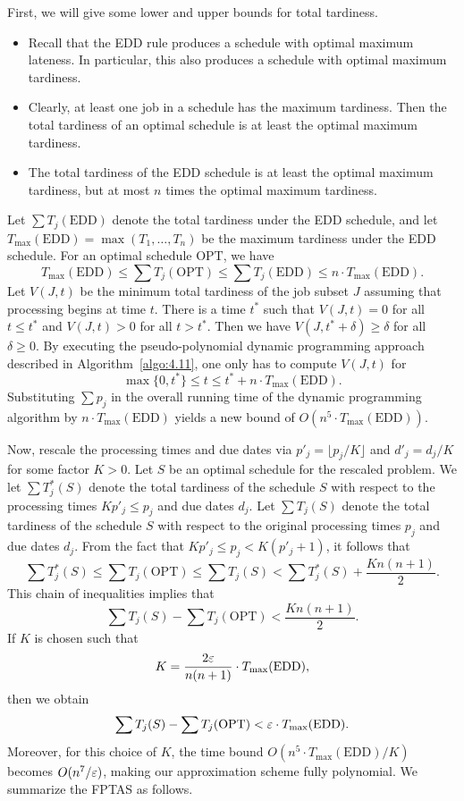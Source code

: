 First, we will give some lower and upper bounds for total tardiness. 
\begin{itemize}
    \item Recall that the EDD rule produces a schedule with optimal 
    maximum lateness. In particular, this also produces a schedule 
    with optimal maximum tardiness. 
    \item Clearly, at least one job in a schedule has the maximum tardiness. 
    Then the total tardiness of an optimal schedule is at least the 
    optimal maximum tardiness. 
    \item The total tardiness of the EDD schedule is at least the optimal 
    maximum tardiness, but at most $n$ times the optimal maximum tardiness. 
\end{itemize}
Let $\sum T_j(\text{EDD})$ denote the total tardiness under the EDD schedule, 
and let $T_{\max}(\text{EDD}) = \max(T_1, \dots, T_n)$ be the maximum 
tardiness under the EDD schedule. For an optimal schedule $\text{OPT}$, we have 
\[ T_{\max}(\text{EDD}) \leq \sum T_j(\text{OPT}) \leq \sum T_j(\text{EDD}) 
\leq n \cdot T_{\max}(\text{EDD}). \] 
Let $V(J, t)$ be the minimum total tardiness of the job subset $J$ 
assuming that processing begins at time $t$. There is a time $t^*$ 
such that $V(J, t) = 0$ for all $t \leq t^*$ and $V(J, t) > 0$ for all 
$t > t^*$. Then we have $V(J, t^* + \delta) \geq \delta$ for all 
$\delta \geq 0$. By executing the pseudo-polynomial dynamic programming 
approach described in Algorithm~\ref{algo:4.11}, one only has to compute 
$V(J, t)$ for 
\[ \max\{0, t^*\} \leq t \leq t^* + n \cdot T_{\max}(\text{EDD}). \] 
Substituting $\sum p_j$ in the overall running time of the dynamic 
programming algorithm by $n \cdot T_{\max}(\text{EDD})$ yields a 
new bound of $O(n^5 \cdot T_{\max}(\text{EDD}))$. 

Now, rescale the processing times and due dates via $p'_j = 
\lfloor p_j/K \rfloor$ and $d'_j = d_j/K$ for some factor $K > 0$. 
Let $S$ be an optimal schedule for the rescaled problem. We let 
$\sum T_j^*(S)$ denote the total tardiness of the schedule $S$ with 
respect to the processing times $Kp'_j \leq p_j$ and due dates $d_j$. 
Let $\sum T_j(S)$ denote the total tardiness of the schedule $S$ with 
respect to the original processing times $p_j$ and due dates $d_j$. 
From the fact that $Kp'_j \leq p_j < K(p'_j + 1)$, it follows that 
\[ \sum T_j^*(S) \leq \sum T_j(\text{OPT}) \leq \sum T_j(S) < 
\sum T_j^*(S) + \frac{Kn(n+1)}{2}. \] 
This chain of inequalities implies that 
\[ \sum T_j(S) - \sum T_j(\text{OPT}) < \frac{Kn(n+1)}{2}. \] 
If $K$ is chosen such that 
\[ K = \frac{2\varepsilon}{n(n+1)} \cdot T_{\max}(\text{EDD}), \] 
then we obtain 
\[ \sum T_j(S) - \sum T_j(\text{OPT}) < \varepsilon \cdot T_{\max}(\text{EDD}). \] 
Moreover, for this choice of $K$, the time bound 
$O(n^5 \cdot T_{\max}(\text{EDD})/K)$ becomes $O(n^7/\varepsilon)$, making 
our approximation scheme fully polynomial. We summarize the FPTAS 
as follows. 

